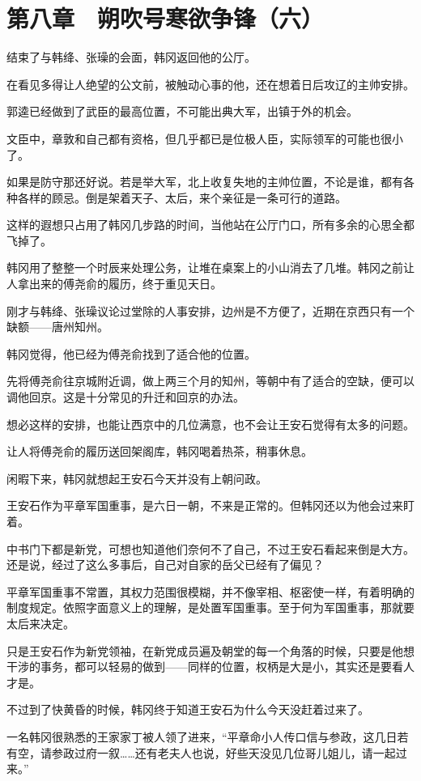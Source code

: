 \section{第八章　朔吹号寒欲争锋（六）}

结束了与韩绛、张璪的会面，韩冈返回他的公厅。

在看见多得让人绝望的公文前，被触动心事的他，还在想着日后攻辽的主帅安排。

郭逵已经做到了武臣的最高位置，不可能出典大军，出镇于外的机会。

文臣中，章敦和自己都有资格，但几乎都已是位极人臣，实际领军的可能也很小了。

如果是防守那还好说。若是举大军，北上收复失地的主帅位置，不论是谁，都有各种各样的顾忌。倒是架着天子、太后，来个亲征是一条可行的道路。

这样的遐想只占用了韩冈几步路的时间，当他站在公厅门口，所有多余的心思全都飞掉了。

韩冈用了整整一个时辰来处理公务，让堆在桌案上的小山消去了几堆。韩冈之前让人拿出来的傅尧俞的履历，终于重见天日。

刚才与韩绛、张璪议论过堂除的人事安排，边州是不方便了，近期在京西只有一个缺额——唐州知州。

韩冈觉得，他已经为傅尧俞找到了适合他的位置。

先将傅尧俞往京城附近调，做上两三个月的知州，等朝中有了适合的空缺，便可以调他回京。这是十分常见的升迁和回京的办法。

想必这样的安排，也能让西京中的几位满意，也不会让王安石觉得有太多的问题。

让人将傅尧俞的履历送回架阁库，韩冈喝着热茶，稍事休息。

闲暇下来，韩冈就想起王安石今天并没有上朝问政。

王安石作为平章军国重事，是六日一朝，不来是正常的。但韩冈还以为他会过来盯着。

中书门下都是新党，可想也知道他们奈何不了自己，不过王安石看起来倒是大方。还是说，经过了这么多事后，自己对自家的岳父已经有了偏见？

平章军国重事不常置，其权力范围很模糊，并不像宰相、枢密使一样，有着明确的制度规定。依照字面意义上的理解，是处置军国重事。至于何为军国重事，那就要太后来决定。

只是王安石作为新党领袖，在新党成员遍及朝堂的每一个角落的时候，只要是他想干涉的事务，都可以轻易的做到——同样的位置，权柄是大是小，其实还是要看人才是。

不过到了快黄昏的时候，韩冈终于知道王安石为什么今天没赶着过来了。

一名韩冈很熟悉的王家家丁被人领了进来，“平章命小人传口信与参政，这几日若有空，请参政过府一叙……还有老夫人也说，好些天没见几位哥儿姐儿，请一起过来。”

